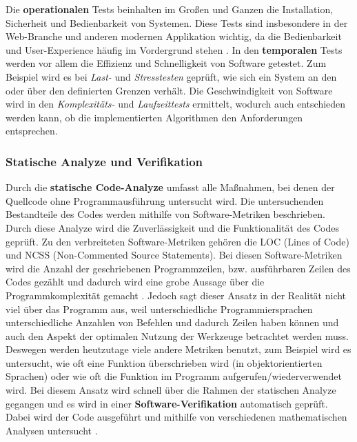 Die \textbf{operationalen} Tests beinhalten im Großen und Ganzen die Installation, Sicherheit und Bedienbarkeit von Systemen. Diese Tests sind insbesondere in der Web-Branche und anderen modernen Applikation wichtig, da die Bedienbarkeit und User-Experience häufig im Vordergrund stehen \cite[170-174]{Hoff:2008:Software:} \cite[242]{Meye:2018:Softwareentwicklung:}.
In den \textbf{temporalen} Tests werden vor allem die Effizienz und Schnelligkeit von Software getestet. Zum Beispiel wird es bei \textit{Last-} und \textit{Stresstesten} geprüft, wie sich ein System an den oder über den definierten Grenzen verhält. 
Die Geschwindigkeit von Software wird in den \textit{Komplexitäts-} und \textit{Laufzeittests} ermittelt, wodurch auch entschieden werden kann, ob die implementierten Algorithmen den Anforderungen entsprechen. 
\subsubsection{Statische Analyze und Verifikation}
\label{subsubsec:qualitaetsmanagement:statAnalyze}
Durch die \textbf{statische Code-Analyze} umfasst alle Maßnahmen, bei denen der Quellcode ohne Programmausführung untersucht wird. Die untersuchenden Bestandteile des Codes werden mithilfe von Software-Metriken beschrieben. 
Durch diese Analyze wird die Zuverlässigkeit und die Funktionalität des Codes geprüft. Zu den verbreiteten Software-Metriken gehören die LOC (Lines of Code) und NCSS (Non-Commented Source Statements). Bei diesen Software-Metriken wird die Anzahl der geschriebenen
Programmzeilen, bzw. ausführbaren Zeilen des Codes gezählt und dadurch wird eine grobe Aussage über die Programmkomplexität gemacht \cite[249,250]{Hoff:2008:Software:}. Jedoch sagt dieser Ansatz in der Realität nicht viel über das Programm aus, weil unterschiedliche Programmiersprachen
unterschiedliche Anzahlen von Befehlen und dadurch Zeilen haben können und auch den Aspekt der optimalen Nutzung der Werkzeuge betrachtet werden muss. Deswegen werden heutzutage viele andere Metriken benutzt, zum Beispiel wird es untersucht, wie oft eine Funktion überschrieben 
wird (in objektorientierten Sprachen) oder wie oft die Funktion im Programm aufgerufen/wiederverwendet wird. Bei diesem Ansatz wird schnell über die Rahmen der statischen Analyze gegangen und es wird in einer \textbf{Software-Verifikation} automatisch geprüft.
Dabei wird der Code ausgeführt und mithilfe von verschiedenen mathematischen Analysen untersucht \cite[334,335]{Hoff:2008:Software:}.

